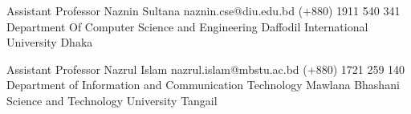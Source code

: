 

\begin{cvreferences}

  \cvreference
    {Assistant Professor} %
    {Naznin Sultana} %
    {naznin.cse@diu.edu.bd} %
    {(+880) 1911 540 341} %
    {Department Of Computer Science and Engineering}
    {Daffodil International University}
    {Dhaka}
    
  \cvreference
    {Assistant Professor} %
    {Nazrul Islam} %
    {nazrul.islam@mbstu.ac.bd} %
    {(+880) 1721 259 140} %
    {Department of Information and Communication Technology}
    {Mawlana Bhashani Science and Technology University}
    {Tangail}
    





\end{cvreferences}

